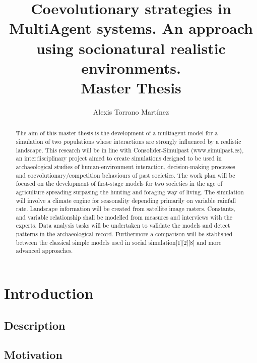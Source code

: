 \documentclass{report}
\begin{document}
\title{Coevolutionary strategies in MultiAgent systems. An approach using socionatural realistic environments.\\
\small{Master Thesis}}
\author{Alexis Torrano Mart\'inez}
\maketitle
\newpage

\begin{abstract}
The aim of this master thesis is the development of a multiagent model for a simulation  of two populations whose interactions are strongly influenced by a realistic landscape.
This research will be in line with Consolider-Simulpast (www.simulpast.es), an interdisciplinary project aimed to create simulations designed to be used in archaeological studies of human-environment interaction, decision-making processes and coevolutionary/competition behaviours of past societies.
The work plan will be focused on the development of first-stage models for two societies in the age of agriculture spreading surpasing the hunting and foraging way of living. The simulation will involve a climate engine for seasonality depending primarily on variable rainfall rate. Landscape information will be created from satellite image rasters. Constants, and variable relationship shall be modelled from measures and interviews with the experts. Data analysis tasks will be undertaken to validate the models and detect patterns in the archaeological record. Furthermore a comparison will be stablished between the classical simple models used in social simulation[1][2][8] and more advanced approaches.
\end{abstract}
\newpage 

\setcounter{tocdepth}{6}
\tableofcontents
\newpage 

\chapter{Introduction}

\section{Description}


\section{Motivation}
\end{document}
